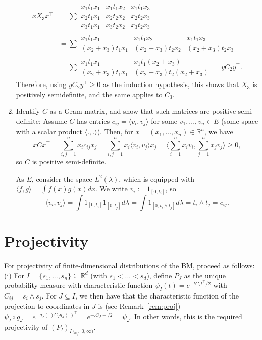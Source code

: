 \documentclass{article}
\theoremstyle{definition}
\theoremstyle{step} \newtheorem{step}{Step}
\begin{document}
\begin{enumerate}
\begin{align*}
    x X_3 x^\top & = \sum \begin{matrix} x_1 t_1 x_1 & x_1 t_1x_2 &
      x_1 t_1 x_3 \\ x_2 t_1 x_1 & x_2 t_2 x_2 & x_2 t_2x_3 \\ x_3 t_1
      x_1 & x_3 t_2 x_2& x_3 t_2x_3\end{matrix} \\ & =
      \sum \begin{matrix} x_1 t_1 x_1 & x_1 t_1x_2 & x_1 t_1 x_3
        \\ (x_2 + x_3) t_1 x_1 & (x_2 + x_3) t_2 x_2 & (x_2 +
        x_3)t_2x_3 \end{matrix} \\ & = \sum \begin{matrix} x_1 t_1 x_1
        & x_1 t_1(x_2 + x_3) \\ (x_2 + x_3) t_1 x_1 & (x_2 + x_3) t_2
        (x_2 + x_3) \end{matrix} = y C_2 y^\top.
  \end{align*}
  Therefore, using $y C_2 y^\top \geq 0$ as the induction hypothesis,
  this shows that $X_3$ is positively semidefinite, and the same
  applies to $C_3$.
\item Identify $C$ as a Gram matrix, and show that such matrices are positive semi-definite: Assume $C$ has entries $c_{ij} = \langle v_i, v_j\rangle$ for some $v_1,...,v_n \in E$ (some space with a scalar product $\langle .,. \rangle$). Then, for $x =
  (x_1,...,x_n) \in \mathbb R^n$, we have
  $$ x C x^\top = \sum_{i,j=1}^n x_i c_{ij} x_j = \sum_{i,j=1}^n
  x_i \langle v_i, v_j\rangle x_j = \langle \sum_{i=1}^n x_i v_i,
  \sum_{j=1}^n x_j v_j\rangle \geq 0,$$ so $C$ is positive semi-definite.

  As $E$, consider the space $L^2(\lambda)$, which is equipped with $\langle f, g\rangle = \int f(x)g(x) dx$. We write $v_i := 1_[0,t_i]$, so
  $$ \langle v_i, v_j \rangle = \int 1_{[0,t_i]}1_{[0,t_j]} d\lambda = \int 1_{[0,t_i \wedge t_j]} d\lambda = t_i \wedge t_j = c_{ij}.$$
\end{enumerate}


\section{Projectivity}\label{S:proj}
For projectivity of finite-dimensional distributions of the BM,
proceed as follows: (i) For $I = \{s_1,...,s_n\} \subseteq \mathbb
R^d$ (with $s_1 < ... < s_d$), define $P_J$ as the unique probability
measure with characteristic function $\psi_I(t) = e^{-tC_It^\top/2}$
with $C_{ij} = s_i \wedge s_j$. For $J\subseteq I$, we then have that
the characteristic function of the projection to coordinates in $J$ is
(see Remark~\ref{rem:proj}) $\psi_I \circ g_J = e^{- g_J(.)  C_I
  g_J(.)^\top} = e^{- . C_J -/2} = \psi_J$. In other words, this is
the required projectivity of $(P_I)_{I \subseteq_f [0,\infty)}$.
\end{document}
